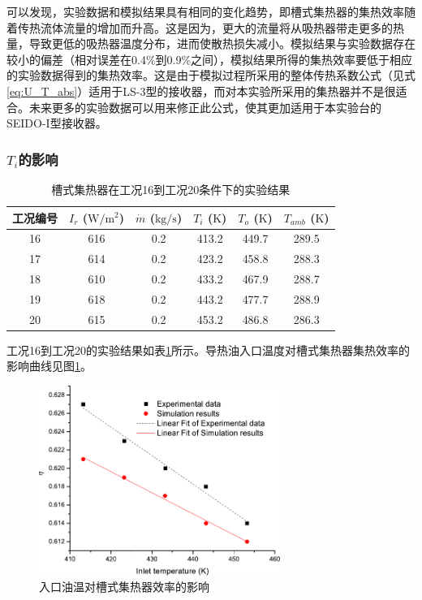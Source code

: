 可以发现，实验数据和模拟结果具有相同的变化趋势，即槽式集热器的集热效率随着传热流体流量的增加而升高。这是因为，更大的流量将从吸热器带走更多的热量，导致更低的吸热器温度分布，进而使散热损失减小。模拟结果与实验数据存在较小的偏差（相对误差在0.4\%到0.9\%之间），模拟结果所得的集热效率要低于相应的实验数据得到的集热效率。这是由于模拟过程所采用的整体传热系数公式（见式\ref{eq:U_T_abs}）适用于LS-3型的接收器，而对本实验所采用的集热器并不是很适合。未来更多的实验数据可以用来修正此公式，使其更加适用于本实验台的SEIDO-I型接收器。

\subsubsection{$T_i$的影响}

\begin{table}[htbp]\footnotesize
\setlength{\abovecaptionskip}{-10pt}
	\caption{槽式集热器在工况16到工况20条件下的实验结果}
	\begin{center}
	\begin{tabular}{cccccc}
		\toprule
		工况编号	& $I_r$ ($\mathrm{W/m^2}$)	&	$\dot{m}$ ($\mathrm{kg/s}$)			&	$T_i$ ($\mathrm{K}$)	&	$T_o$ ($\mathrm{K}$)		&	$T_{amb}$ ($\mathrm{K}$)\\
		\midrule
		16	&	616	&	0.2	&	413.2	&	449.7	&	289.5\\
		17	&	614	&	0.2	&	423.2	&	458.8	&	288.3\\
		18	&	610	&	0.2	&	433.2	&	467.9	&	288.7	\\
		19	&	618	&	0.2	&	443.2	&	477.7	&	288.9\\
		20	&	615	&	0.2	&	453.2	&	486.8	&	286.3\\
		\bottomrule
	\end{tabular}
	\end{center}
	\label{tab:ResultOfTrough3}
\end{table}
工况16到工况20的实验结果如表\ref{tab:ResultOfTrough3}所示。导热油入口温度对槽式集热器集热效率的影响曲线见图\ref{fig:T_i-eta-trough}。

\begin{figure}[!ht]
\centering
\includegraphics[width=0.7\textwidth]{fig/T_i-eta-trough}
\caption{入口油温对槽式集热器效率的影响}
\label{fig:T_i-eta-trough}
\end{figure}

